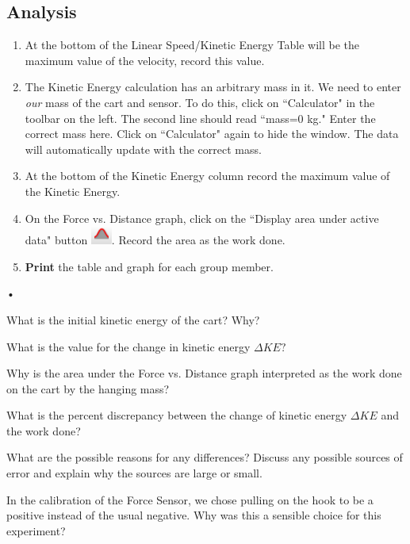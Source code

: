 \documentclass[main.tex]{subfiles}
\begin{document}
\subsection*{Analysis}
\begin{enumerate}
\item
At the bottom of the Linear Speed/Kinetic Energy Table will be the maximum value of the velocity, record this value.
\item
The Kinetic Energy calculation has an arbitrary mass in it. We need to enter \emph{our} mass of the cart and sensor. To do this, click on ``Calculator" in the toolbar on the left. The second line should read ``mass=0 kg." Enter the correct mass here. Click on ``Calculator" again to hide the window. The data will automatically update with the correct mass.
\item
At the bottom of the Kinetic Energy column record the maximum value of the Kinetic Energy.
\item
On the Force vs. Distance graph, click on the ``Display area under active data" button \includegraphics{Area_Under_Curve}. Record the area as the work done.
\item
\textbf{Print} the table and graph for each group member.
\end{enumerate}•

\begin{question}
What is the initial kinetic energy of the cart? Why?
\end{question}
\begin{question}
What is the value for the change in kinetic energy $\Delta KE?$
\end{question}
\begin{question}
Why is the area under the Force vs. Distance graph interpreted as the work done on the cart by the hanging mass?
\end{question}
\begin{question}
What is the percent discrepancy between the change of kinetic energy $\Delta KE$ and the work done?
\end{question}
\begin{question}
What are the possible reasons for any differences? Discuss any possible sources of error and explain why the sources are large or small.
\end{question}
\begin{question}
In the calibration of the Force Sensor, we chose pulling on the hook to be a positive instead of the usual negative. Why was this a sensible choice for this experiment?
\end{question}
\end{document}

